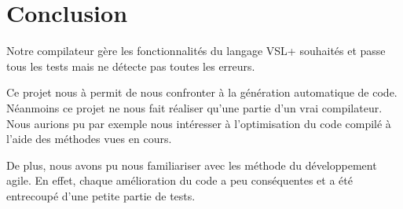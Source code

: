 \documentclass[10pt,a4paper]{article}
\begin{document}
\section{Conclusion}

Notre compilateur gère les fonctionnalités du langage VSL+ souhaités et passe tous les tests mais ne d\'etecte pas toutes les erreurs.

Ce projet nous à permit de nous confronter à la génération automatique de code. 
Néanmoins ce projet ne nous fait réaliser qu'une partie d'un vrai compilateur. Nous aurions pu par exemple nous intéresser à l'optimisation du code compilé à l'aide des méthodes vues en cours.

De plus, nous avons pu nous familiariser avec les méthode du développement agile. En effet, chaque amélioration du code a peu conséquentes et a été entrecoupé d'une petite partie de tests.
\end{document}
